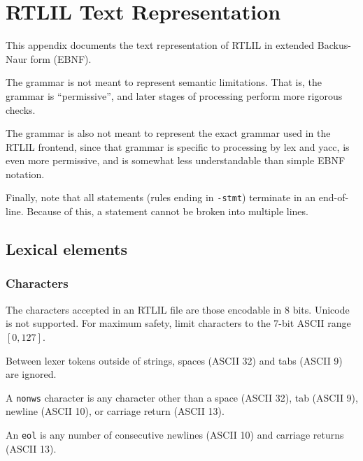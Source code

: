\chapter{RTLIL Text Representation}
\label{chapter:textrtlil}

\newlength{\myl}

\newenvironment{indentgrammar}[1]
    {\vspace{0.5cm}\hrule
    \setlength{\myl}{\widthof{#1}+2em}
    \grammarindent\the\myl
    \begin{grammar}}
    {\end{grammar}
    \hrule}

This appendix documents the text representation of RTLIL in extended Backus-Naur form (EBNF).

The grammar is not meant to represent semantic limitations. That is, the grammar is ``permissive'', and later stages of processing perform more rigorous checks.

The grammar is also not meant to represent the exact grammar used in the RTLIL frontend, since that grammar is specific to processing by lex and yacc, is even more permissive, and is somewhat less understandable than simple EBNF notation.

Finally, note that all statements (rules ending in \texttt{-stmt}) terminate in an end-of-line. Because of this, a statement cannot be broken into multiple lines.

\section{Lexical elements}

\subsection{Characters}

The characters accepted in an RTLIL file are those encodable in 8 bits. Unicode is not supported. For maximum safety, limit characters to the 7-bit ASCII range $[0,127]$.

Between lexer tokens outside of strings, spaces (ASCII 32) and tabs (ASCII 9) are ignored.

A \texttt{nonws} character is any character other than a space (ASCII 32), tab (ASCII 9), newline (ASCII 10), or carriage return (ASCII 13).

An \texttt{eol} is any number of consecutive newlines (ASCII 10) and carriage returns (ASCII 13).

